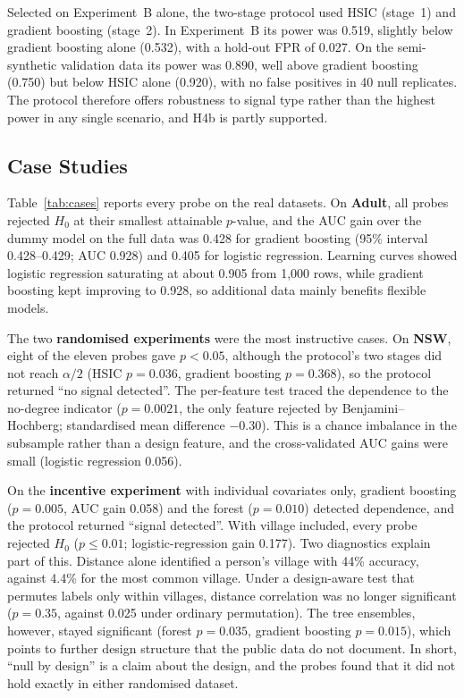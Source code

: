 Selected on Experiment~B alone, the two-stage protocol used HSIC (stage~1) and gradient boosting (stage~2). In Experiment~B its power was 0.519, slightly below gradient boosting alone (0.532), with a hold-out FPR of 0.027. On the semi-synthetic validation data its power was 0.890, well above gradient boosting (0.750) but below HSIC alone (0.920), with no false positives in 40 null replicates. The protocol therefore offers robustness to signal type rather than the highest power in any single scenario, and H4b is partly supported.

\subsection{Case Studies}

Table~\ref{tab:cases} reports every probe on the real datasets. On \textbf{Adult}, all probes rejected $H_0$ at their smallest attainable $p$-value, and the AUC gain over the dummy model on the full data was 0.428 for gradient boosting (95\% interval 0.428--0.429; AUC 0.928) and 0.405 for logistic regression. Learning curves showed logistic regression saturating at about 0.905 from 1{,}000 rows, while gradient boosting kept improving to 0.928, so additional data mainly benefits flexible models.



The two \textbf{randomised experiments} were the most instructive cases. On \textbf{NSW}, eight of the eleven probes gave $p<0.05$, although the protocol's two stages did not reach $\alpha/2$ (HSIC $p=0.036$, gradient boosting $p=0.368$), so the protocol returned ``no signal detected''. The per-feature test traced the dependence to the no-degree indicator ($p=0.0021$, the only feature rejected by Benjamini--Hochberg; standardised mean difference $-0.30$). This is a chance imbalance in the subsample rather than a design feature, and the cross-validated AUC gains were small (logistic regression 0.056).

On the \textbf{incentive experiment} with individual covariates only, gradient boosting ($p=0.005$, AUC gain 0.058) and the forest ($p=0.010$) detected dependence, and the protocol returned ``signal detected''. With village included, every probe rejected $H_0$ ($p\le0.01$; logistic-regression gain 0.177). Two diagnostics explain part of this. Distance alone identified a person's village with 44\% accuracy, against 4.4\% for the most common village. Under a design-aware test that permutes labels only within villages, distance correlation was no longer significant ($p=0.35$, against 0.025 under ordinary permutation). The tree ensembles, however, stayed significant (forest $p=0.035$, gradient boosting $p=0.015$), which points to further design structure that the public data do not document. In short, ``null by design'' is a claim about the design, and the probes found that it did not hold exactly in either randomised dataset.

